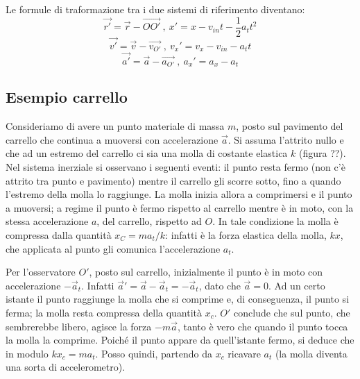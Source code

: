 \documentclass[class=book, crop=false, oneside, 12pt]{standalone}
\begin{document}
Le formule di traformazione tra i due sistemi di riferimento diventano:
\begin{equation*}
    \overrightarrow{r'} = \overrightarrow{r} - \overrightarrow{OO'} \ , \ x' = x - v_{in} t - \frac{1}{2} a_t t^2
\end{equation*}
\begin{equation*}
    \overrightarrow{v'} = \overrightarrow{v} - \overrightarrow{v_{O'}} \ , \ v_x' = v_x -v_{in} - a_t t
\end{equation*}
\begin{equation*}
    \overrightarrow{a'} = \overrightarrow{a} - \overrightarrow{a_{O'}} \ , \ a_x' = a_x - a_t
\end{equation*}


\subsection{Esempio carrello}
Consideriamo di avere un punto materiale di massa \(m\), posto sul pavimento del carrello che continua a muoversi con accelerazione \(\overrightarrow{a}\). 
Si assuma l'attrito nullo e che ad un estremo del carrello ci sia una molla di costante elastica \(k\) (figura ??). %
Nel sistema inerziale si osservano i seguenti eventi: il punto resta fermo (non c'è attrito tra punto e pavimento) mentre il carrello gli scorre sotto, fino a quando l'estremo della molla lo raggiunge. 
La molla inizia allora a comprimersi e il punto a muoversi; a regime il punto è fermo rispetto al carrello mentre è in moto, con la stessa accelerazione \(a\), del carrello, rispetto ad \(O\). 
In tale condizione la molla è compressa dalla quantità \(x_C = m a_t / k\): infatti è la forza elastica della molla, \(k x\), che applicata al punto gli comunica l'accelerazione \(a_t\).

Per l'osservatore \(O'\), posto sul carrello, inizialmente il punto è in moto con accelerazione \(-\overrightarrow{a}_{t}\). 
Infatti \(\overrightarrow{a}' = \overrightarrow{a} -\overrightarrow{a}_t= -\overrightarrow{a}_t \), dato che \(\overrightarrow{a} = 0\). 
Ad un certo istante il punto raggiunge la molla che si comprime e, di conseguenza, il punto si ferma; la molla resta compressa della quantità \(x_c\). 
\(O'\) conclude che sul punto, che sembrerebbe libero, agisce la forza \(-m \overrightarrow{a}\), tanto è vero che quando il punto tocca la molla la comprime. 
Poiché il punto appare da quell'istante fermo, si deduce che in modulo \(k x_c = m a_t\). 
Posso quindi, partendo da \(x_c\) ricavare \(a_t\) (la molla diventa una sorta di accelerometro).
\end{document}
